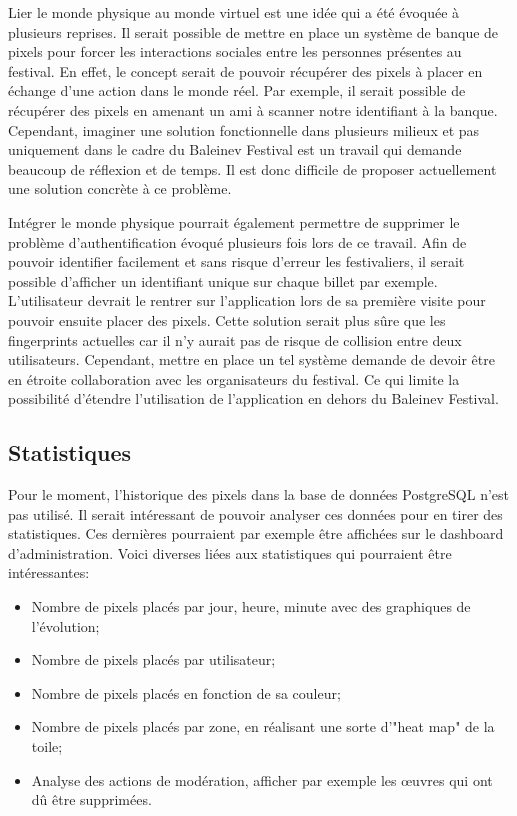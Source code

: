 Lier le monde physique au monde virtuel est une idée qui a été évoquée à plusieurs reprises. Il serait possible de mettre en place un système de banque de pixels pour forcer les interactions sociales entre les personnes présentes au festival. En effet, le concept serait de pouvoir récupérer des pixels à placer en échange d'une action dans le monde réel. Par exemple, il serait possible de récupérer des pixels en amenant un ami à scanner notre identifiant à la banque. Cependant, imaginer une solution fonctionnelle dans plusieurs milieux et pas uniquement dans le cadre du Baleinev Festival est un travail qui demande beaucoup de réflexion et de temps. Il est donc difficile de proposer actuellement une solution concrète à ce problème.

Intégrer le monde physique pourrait également permettre de supprimer le problème d'authentification évoqué plusieurs fois lors de ce travail. Afin de pouvoir identifier facilement et sans risque d'erreur les festivaliers, il serait possible d'afficher un identifiant unique sur chaque billet par exemple. L'utilisateur devrait le rentrer sur l'application lors de sa première visite pour pouvoir ensuite placer des pixels. Cette solution serait plus sûre que les fingerprints actuelles car il n'y aurait pas de risque de collision entre deux utilisateurs. Cependant, mettre en place un tel système demande de devoir être en étroite collaboration avec les organisateurs du festival. Ce qui limite la possibilité d'étendre l'utilisation de l'application en dehors du Baleinev Festival.

\subsection{Statistiques}

Pour le moment, l'historique des pixels dans la base de données PostgreSQL n'est pas utilisé. Il serait intéressant de pouvoir analyser ces données pour en tirer des statistiques. Ces dernières pourraient par exemple être affichées sur le dashboard d'administration. Voici diverses liées aux statistiques qui pourraient être intéressantes:

\begin{itemize}
  \item Nombre de pixels placés par jour, heure, minute avec des graphiques de l'évolution;
  \item Nombre de pixels placés par utilisateur;
  \item Nombre de pixels placés en fonction de sa couleur;
  \item Nombre de pixels placés par zone, en réalisant une sorte d'"heat map" de la toile;
  \item Analyse des actions de modération, afficher par exemple les \oe{}uvres qui ont dû être supprimées.
\end{itemize}

